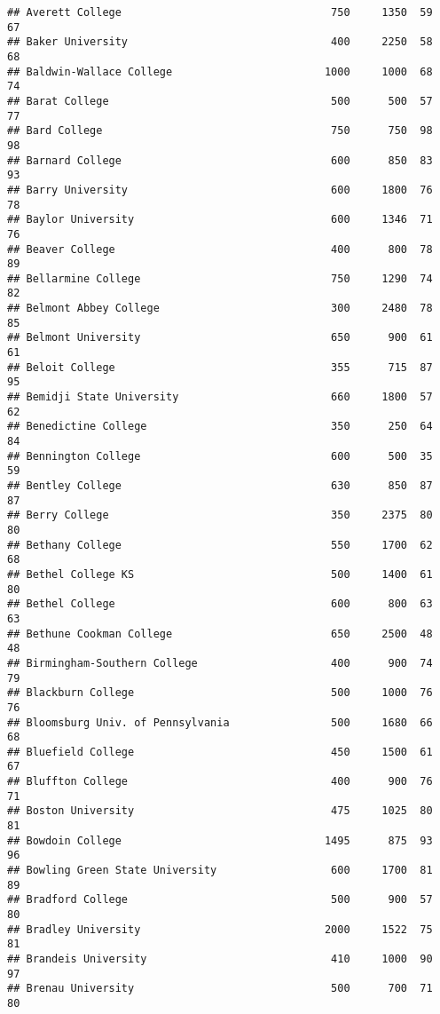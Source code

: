 \documentclass[
]{article}
\begin{document}
\begin{verbatim}
## Averett College                                 750     1350  59       67
## Baker University                                400     2250  58       68
## Baldwin-Wallace College                        1000     1000  68       74
## Barat College                                   500      500  57       77
## Bard College                                    750      750  98       98
## Barnard College                                 600      850  83       93
## Barry University                                600     1800  76       78
## Baylor University                               600     1346  71       76
## Beaver College                                  400      800  78       89
## Bellarmine College                              750     1290  74       82
## Belmont Abbey College                           300     2480  78       85
## Belmont University                              650      900  61       61
## Beloit College                                  355      715  87       95
## Bemidji State University                        660     1800  57       62
## Benedictine College                             350      250  64       84
## Bennington College                              600      500  35       59
## Bentley College                                 630      850  87       87
## Berry College                                   350     2375  80       80
## Bethany College                                 550     1700  62       68
## Bethel College KS                               500     1400  61       80
## Bethel College                                  600      800  63       63
## Bethune Cookman College                         650     2500  48       48
## Birmingham-Southern College                     400      900  74       79
## Blackburn College                               500     1000  76       76
## Bloomsburg Univ. of Pennsylvania                500     1680  66       68
## Bluefield College                               450     1500  61       67
## Bluffton College                                400      900  76       71
## Boston University                               475     1025  80       81
## Bowdoin College                                1495      875  93       96
## Bowling Green State University                  600     1700  81       89
## Bradford College                                500      900  57       80
## Bradley University                             2000     1522  75       81
## Brandeis University                             410     1000  90       97
## Brenau University                               500      700  71       80

\end{verbatim}
\end{document}
